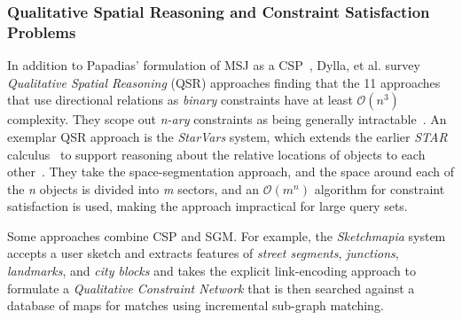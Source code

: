 \subsubsection{Qualitative Spatial Reasoning and Constraint Satisfaction Problems}
    \par{
    In addition to Papadias' formulation of MSJ as a CSP~\cite{Papadias1998}, Dylla, et al. survey \textit{Qualitative Spatial Reasoning} (QSR) approaches finding that the 11 approaches that use directional relations as \textit{binary} constraints have at least $\mathcal{O}(n^3)$ complexity. 
    They scope out \textit{n-ary} constraints as being generally intractable~\cite{Dylla2017}. 
    An exemplar QSR approach is the \textit{StarVars} system, which extends the earlier \textit{STAR} calculus~\cite{Renz2004} to support reasoning about the relative locations of objects to each other~\cite{Lee2013}.
    They take the space-segmentation approach, and the space around each of the \textit{n} objects is divided into \textit{m} sectors, and an $\mathcal{O}(m^n)$ algorithm for constraint satisfaction is used, making the approach impractical for large query sets.}
    
\par{
        Some approaches combine CSP and SGM. For example, the \textit{Sketchmapia} system accepts a user sketch and extracts features of \textit{street segments}, \textit{junctions}, \textit{landmarks}, and \textit{city blocks} and takes the explicit link-encoding approach to formulate a \textit{Qualitative Constraint Network} that is then searched against a database of maps for matches using incremental sub-graph matching.
}    


